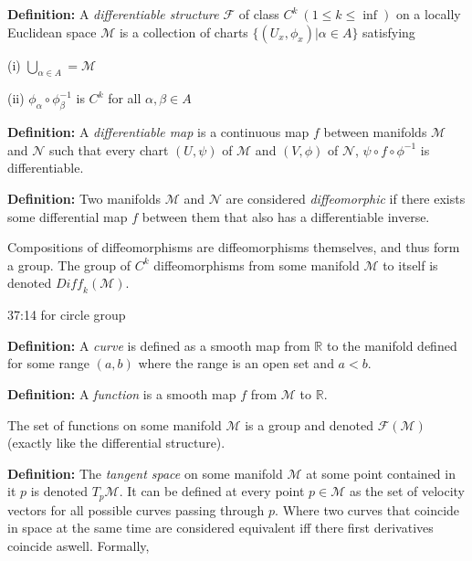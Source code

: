 \documentclass{article}\usepackage[]{graphicx}\usepackage[]{color}
\begin{document}



\textbf{Definition:} A \textit{differentiable structure} $\mathcal{F}$ of class $C^k\ (1\leq k \leq \inf)$ on a locally Euclidean space $\mathcal{M}$ is a collection of charts $\lbrace (U_x , \phi_x)\vert \alpha \in A \rbrace$ satisfying 

(i) $\bigcup_{\alpha \in A}=\mathcal{M}$

(ii) $\phi_{\alpha}\circ\phi_{\beta}^{-1}$ is $C^k$ for all $\alpha ,\beta \in A$




\textbf{Definition:} A \textit{differentiable map} is a continuous map $f$ between manifolds $\mathcal{M}$ and $\mathcal{N}$ such that every chart $(U,\psi )$ of $\mathcal{M}$ and $(V,\phi )$ of $\mathcal{N}$, $\psi\circ f\circ\phi^{-1}$ is differentiable.




\textbf{Definition:} Two manifolds $\mathcal{M}$ and $\mathcal{N}$ are considered \textit{diffeomorphic} if there exists some differential map $f$ between them that also has a differentiable inverse.

Compositions of diffeomorphisms are diffeomorphisms themselves, and thus form a group. The group of $C^k$ diffeomorphisms from some manifold $\mathcal{M}$ to itself is denoted $\mathit{Diff_k}(\mathcal{M})$.

37:14 for circle group


\textbf{Definition:} A \textit{curve} is defined as a smooth map from $\mathbb{R}$ to the manifold defined for some range $(a,b)$ where the range is an open set and $a<b$.




\textbf{Definition:} A \textit{function} is a smooth map $f$ from $\mathcal{M}$ to $\mathbb{R}$.

 

The set of functions on some manifold $\mathcal{M}$ is a group and denoted $\mathcal{F(M)}$ (exactly like the differential structure).

\textbf{Definition:} The \textit{tangent space} on some manifold $\mathcal{M}$ at some point contained in it $p$ is denoted $T_p\mathcal{M}$. It can be defined at every point $p \in \mathcal{M}$ as the set of velocity vectors for all possible curves passing through $p$. Where two curves that coincide in space at the same time are considered equivalent iff there first derivatives coincide aswell. Formally,
\end{document}
